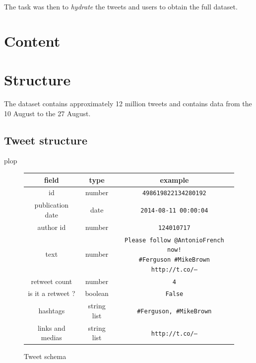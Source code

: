 \documentclass[a4paper,12pt]{report}
\begin{document}
The task was then to \emph{hydrate} the tweets and users to obtain the full dataset.

\newpage

\section{Content}

\section{Structure}
The dataset contains approximately 12 million tweets and contains data from the 10 August to the 27 August.

\subsection{Tweet structure}
plop
\begin{figure}[h!]
\centering
\begin{tabular}{c|c|c}
field & type & example\\
\midrule
id & number & \texttt{498619822134280192} \\ \hline
publication date & date & \texttt{2014-08-11 00:00:04} \\ \hline
author id & number & \texttt{124010717} \\ \hline
text & number & \pbox{9cm}{\vspace*{5pt}\texttt{Please follow @AntonioFrench now! \newline \#Ferguson \#MikeBrown http://t.co/---}\vspace*{5pt}} \\ \hline
retweet count & number & \texttt{4} \\ \hline
is it a retweet ? & boolean & \texttt{False} \\ \hline
hashtags & string list & \texttt{\#Ferguson, \#MikeBrown} \\ \hline
links and medias & string list & \texttt{http://t.co/---} \\ \hline
\end{tabular}
\caption{Tweet schema}
\end{figure}

\newpage
\end{document}

